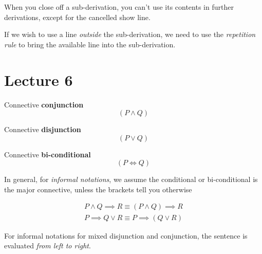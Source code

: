 \documentclass[11pt]{article}
\begin{document}
	\begin{remark}
		When you close off a sub-derivation, you can’t use its contents in further derivations, except for the cancelled show line.
	\end{remark}
	
	\begin{remark}
		If we wish to use a line \emph{outside} the sub-derivation, we need to use the \emph{repetition rule} to bring the available line into the sub-derivation.
	\end{remark}
	
	\section{Lecture 6}
		\begin{definition}
			Connective \textbf{conjunction}
			\begin{equation}
				(P \land Q)
			\end{equation}
		\end{definition}
		
		\begin{definition}
			Connective \textbf{disjunction}
			\begin{equation}
				(P \lor Q)
			\end{equation}
		\end{definition}
		
		\begin{definition}
			Connective \textbf{bi-conditional}
			\begin{equation}
				(P \iff Q)
			\end{equation}
		\end{definition}
		
		\begin{remark}
			In general, for \emph{informal notations}, we assume the conditional or bi-conditional is the major connective, unless the brackets tell you otherwise
		\end{remark}
		\begin{example}
			\begin{gather}
				P \land Q \implies R \equiv (P \land Q) \implies R \\
				P \implies Q \lor R \equiv P \implies (Q \lor R)
			\end{gather}
		\end{example}
		
		\begin{remark}
			For informal notations for mixed disjunction and conjunction, the sentence is evaluated \emph{from left to right}.
		\end{remark}
		
\end{document}
